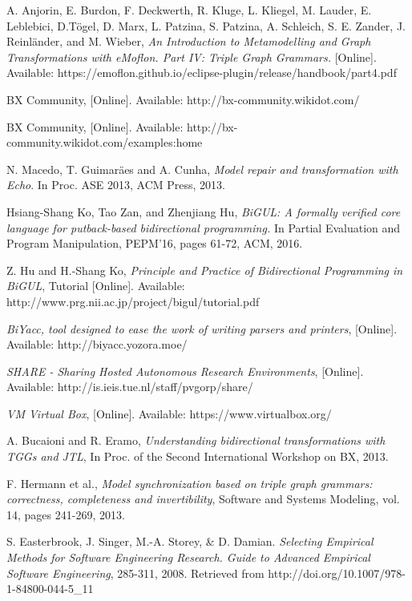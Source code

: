 \begin{thebibliography}{1}
	 A. Anjorin, E. Burdon, F. Deckwerth, R. Kluge, L. Kliegel, M. Lauder, E. Leblebici, D.T\"ogel, D. Marx, L. Patzina, S. Patzina, A. Schleich, S. E. Zander, J. Reinl\"ander, and M. Wieber, {\em An Introduction to Metamodelling and Graph Transformations with eMoflon. Part IV: Triple Graph Grammars.} [Online]. Available: 
	https://emoflon.github.io/eclipse-plugin/release/handbook/part4.pdf
	
	 BX Community, [Online]. Available: http://bx-community.wikidot.com/
	
	 BX Community, [Online]. Available: http://bx-community.wikidot.com/examples:home
	
	 N. Macedo, T. Guimar\"aes and A. Cunha, {\em Model repair and transformation with Echo}. In Proc. ASE 2013, ACM Press, 2013.
	
	 Hsiang-Shang Ko, Tao Zan, and Zhenjiang Hu, {\em BiGUL: A formally verified core language for putback-based bidirectional programming.} In Partial Evaluation and Program Manipulation, PEPM'16, pages 61-72, ACM, 2016.
	
	 Z. Hu and H.-Shang Ko,  {\em Principle and Practice of Bidirectional Programming in BiGUL}, Tutorial [Online]. Available: http://www.prg.nii.ac.jp/project/bigul/tutorial.pdf
	
	 {\em BiYacc, tool designed to ease the work of writing parsers and printers}, [Online]. Available: http://biyacc.yozora.moe/
	
	 {\em SHARE - Sharing Hosted Autonomous Research Environments}, [Online]. Available: http://is.ieis.tue.nl/staff/pvgorp/share/
	
	 {\em VM Virtual Box}, [Online]. Available: https://www.virtualbox.org/
	
	 A. Bucaioni and R. Eramo, {\em Understanding bidirectional transformations with TGGs and JTL}, In Proc. of the Second International Workshop on BX, 2013.
	
	 F. Hermann et al., {\em Model synchronization based on triple graph grammars: correctness, completeness and invertibility}, Software and Systems Modeling, vol. 14, pages 241-269, 2013.
	
	 S. Easterbrook, J. Singer, M.-A. Storey, \& D. Damian. {\em Selecting Empirical Methods for Software Engineering Research. Guide to Advanced Empirical Software Engineering}, 285-311, 2008. Retrieved from http://doi.org/10.1007/978-1-84800-044-5\_11
	

\end{thebibliography}
